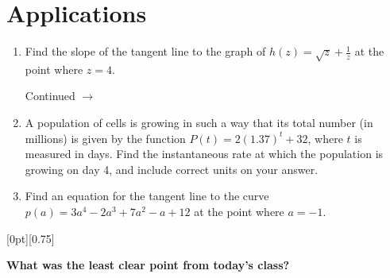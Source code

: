 \documentclass[11pt]{article}
\newcommand{\cuthere}{%
\noindent
\raisebox{-2.8pt}[0pt][0.75\baselineskip]{\small\ding{34}}
\unskip{\tiny\dotfill}
}
\def\ra{\rightarrow}
\def\pageturn{\vfill 
\begin{flushright}
	\begin{small}
		Continued $\ra$
	\end{small}
\end{flushright} \newpage}
\begin{document}
\section{Applications}

\begin{enumerate}
	\item Find the slope of the tangent line to the graph of $h(z) = \sqrt{z} + \frac{1}{z}$ at the point where $z = 4$. 
	
	\pageturn
	
	\item A population of cells is growing in such a way that its total number (in millions) is given by the function $P(t) = 2(1.37)^t + 32$, where $t$ is measured in days. Find the instantaneous rate at which the population is growing on day 4, and include correct units on your answer. 
	\vspace{4in}
	
	\item Find an equation for the tangent line to the curve $p(a) = 3a^4 - 2a^3 + 7a^2 - a + 12$ at the point where $a = -1$. 
\end{enumerate}

\vfill

\cuthere

\noindent
\textbf{What was the least clear point from today's class?}

\vspace{1in}
\end{document}
